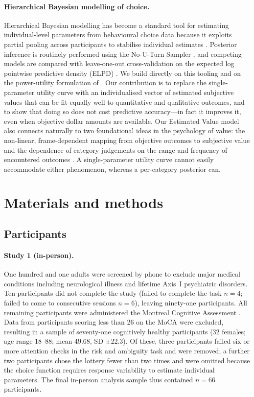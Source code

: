 \documentclass[11pt]{article}
\begin{document}
\paragraph{Hierarchical Bayesian modelling of choice.} Hierarchical Bayesian modelling has become a standard tool for estimating individual-level parameters from behavioural choice data because it exploits partial pooling across participants to stabilise individual estimates \citep{salvatier2016pymc3,kumar2019arviz}. Posterior inference is routinely performed using the No-U-Turn Sampler \citep{hoffman2014nuts}, and competing models are compared with leave-one-out cross-validation on the expected log pointwise predictive density (ELPD) \citep{vehtari2017loo}. We build directly on this tooling and on the power-utility formulation of \citet{levy2012measuring}. Our contribution is to replace the single-parameter utility curve with an individualised vector of estimated subjective values that can be fit equally well to quantitative and qualitative outcomes, and to show that doing so does not cost predictive accuracy---in fact it improves it, even when objective dollar amounts are available. Our Estimated Value model also connects naturally to two foundational ideas in the psychology of value: the non-linear, frame-dependent mapping from objective outcomes to subjective value \citep{kahneman1979prospect} and the dependence of category judgements on the range and frequency of encountered outcomes \citep{parducci1965range}. A single-parameter utility curve cannot easily accommodate either phenomenon, whereas a per-category posterior can.

\section{Materials and methods}

\subsection{Participants}

\paragraph{Study 1 (in-person).} One hundred and one adults were screened by phone to exclude major medical conditions including neurological illness and lifetime Axis~I psychiatric disorders. Ten participants did not complete the study (failed to complete the task $n=4$; failed to come to consecutive sessions $n=6$), leaving ninety-one participants. All remaining participants were administered the Montreal Cognitive Assessment \citep{nasreddine2005moca,fujiwara2010mocaj}. Data from participants scoring less than 26 on the MoCA were excluded, resulting in a sample of seventy-one cognitively healthy participants (32 females; age range 18--88; mean 49.68, SD $\pm$22.3). Of these, three participants failed six or more attention checks in the risk and ambiguity task and were removed; a further two participants chose the lottery fewer than two times and were omitted because the choice function requires response variability to estimate individual parameters. The final in-person analysis sample thus contained $n=66$ participants.
\end{document}
